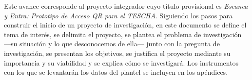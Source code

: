 Este avance corresponde al proyecto integrador cuyo título provisional es
\textit{Escanea y Entra: Prototipo de Acceso QR para el TESCHA}. Siguiendo los
pasos para construir el inicio de un proyecto de investigación, en este
documento se define el tema de interés, se delimita el proyecto, se plantea
el problema de investigación —su situación y lo que desconocemos de ella—
junto con la pregunta de investigación, se presentan los objetivos,
se justifica el proyecto mediante su importancia y su viabilidad
y se explica cómo se investigará. Los instrumentos con los que
se levantarán los datos del plantel se incluyen en los apéndices.
